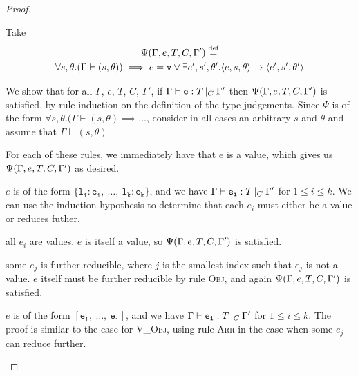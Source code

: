 \documentclass[a4paper]{article}
\theoremstyle{definition}
\theoremstyle{dotless}
\begin{document}
\begin{proof} \label{expProgressProof}

  Take 
  \begin{multline*}
  	\Psi(\Gamma, e, T, C, \Gamma') \stackrel{\text{def}}{=} \\
  	\forall s,\theta. (\Gamma \vdash (s,\theta))\implies e=\mathtt{v}\vee
  	\exists e', s',\theta'. \langle{}e,s,\theta\rangle{}\rightarrow{}\langle{}e',s',\theta'\rangle
  \end{multline*}

  We show that for all $\Gamma$, $e$, $T$, $C$, $\Gamma'$, if $\Gamma{}\vdash\mathtt{e}: T\,|_C\:\Gamma'$
  then $\Psi(\Gamma, e, T, C, \Gamma')$ is satisfied, by rule induction on the definition of the
  type judgements. Since $\Psi$ is of the form
  $\forall s,\theta.(\Gamma\vdash(s,\theta)\implies\dots$,
  consider in all cases an arbitrary $s$ and $\theta$ and assume that $\Gamma\vdash(s,\theta)$.

  \begin{case}\label{values} 

	For each of these rules, we immediately have that $e$ is a value, which
	gives us $\Psi(\Gamma, e, T, C, \Gamma'){}$ as desired.

  \end{case}

  \begin{case}[V\_Obj]\label{v_obj}

	$e$ is of the form $\mathtt{\{l_1: e_1,\ \dots,\ l_k: e_k\}}$, and we have $\Gamma{}\vdash\mathtt{e_i}: T\,|_C\:\Gamma'$ for $1 \leq i \leq k$.
	We can use the induction hypothesis to determine that each $e_i$ must
	either be a value or reduces futher.
	\begin{subcase}
	  all $e_i$ are values. 
	  $e$ is itself a value, so $\Psi(\Gamma, e, T, C, \Gamma')$ is
	  satisfied.
  	\end{subcase}
  	\begin{subcase}
  	  some $e_j$ is further reducible,
  	  where $j$ is the smallest index such
  	  that $e_j$ is not a value. $e$ itself must be further reducible by
  	  rule \textsc{Obj}, and again $\Psi(\Gamma, e, T, C, \Gamma')$ is satisfied.
	\end{subcase}
  \end{case}

  \begin{case}[V\_Arr]\label{v_arr}

	$e$ is of the form $\mathtt{[e_1,\ \dots,\ e_i]}$, and we have $\Gamma{}\vdash\mathtt{e_i}: T\,|_C\:\Gamma'$ for $1 \leq i \leq k$.
	The proof is similar to the case for \textsc{V\_Obj}, using rule
	\textsc{Arr} in the case when some $e_j$ can reduce further.


\end{case}
\end{proof}
\end{document}
